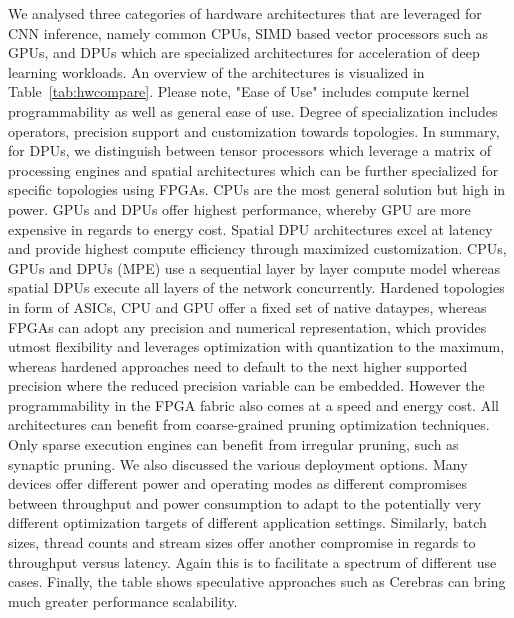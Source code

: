 We analysed three categories of hardware architectures that are leveraged for CNN inference, namely common CPUs, SIMD based vector processors such as GPUs, and DPUs which are specialized architectures for acceleration of deep learning workloads. 
An overview of the architectures is visualized in Table~\ref{tab:hwcompare}.
Please note, "Ease of Use" includes compute kernel programmability as well as general ease of use.
Degree of specialization includes operators, precision support and customization towards topologies.
In summary, for DPUs, we distinguish between tensor processors which leverage a matrix of processing engines and spatial architectures which can be further specialized for specific topologies using FPGAs.
CPUs are the most general solution but high in power. GPUs and DPUs offer highest performance, whereby GPU are more expensive in regards to energy cost. Spatial DPU architectures excel at latency and provide highest compute efficiency through maximized customization. 
CPUs, GPUs and DPUs (MPE) use a sequential layer by layer compute model whereas spatial DPUs execute all layers of the network concurrently. 
Hardened topologies in form of ASICs, CPU and GPU offer a fixed set of native dataypes, whereas FPGAs can adopt any precision and numerical representation, which provides utmost flexibility and leverages optimization with quantization to the maximum, whereas hardened approaches need to default to the next higher supported precision where the reduced precision variable can be embedded. However the programmability in the FPGA fabric also comes at a speed and energy cost.
All architectures can benefit from coarse-grained pruning optimization techniques. Only sparse execution engines can benefit from irregular pruning, such as synaptic pruning.
We also discussed the various deployment options. 
Many devices offer different power and operating modes as different compromises between throughput and power consumption to adapt to the potentially very different optimization targets of different application settings. Similarly, batch sizes, thread counts and stream sizes offer another compromise in regards to throughput versus latency. Again this is to facilitate a spectrum of different use cases.
Finally, the table shows speculative approaches such as Cerebras can bring much greater performance scalability.






